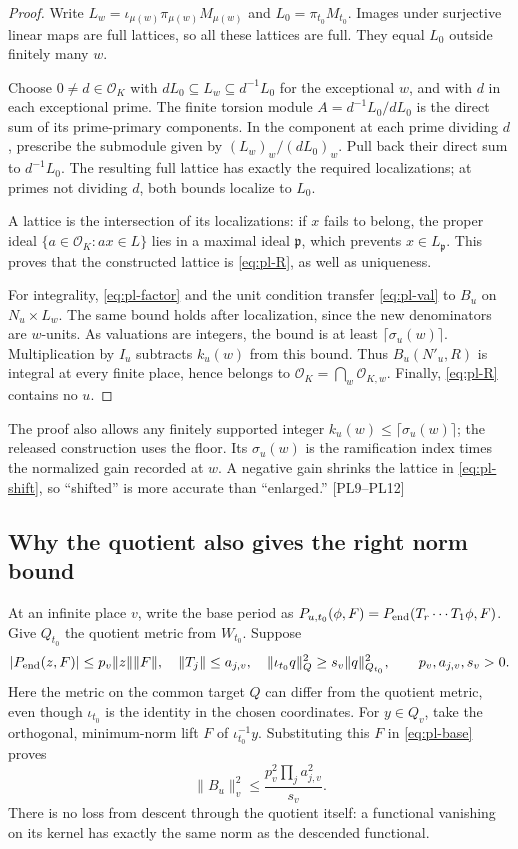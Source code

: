 \documentclass[11pt,a4paper]{article}
\numberwithin{equation}{section}
\theoremstyle{remark}\newtheorem{remark}[theorem]{Remark}
\newcommand{\OK}{\mathcal O_K}
\begin{document}
\begin{proof}
Write $L_w=\iota_{\mu(w)}\pi_{\mu(w)}M_{\mu(w)}$ and $L_0=\pi_{t_0}M_{t_0}$. Images under surjective linear maps are full lattices, so all these lattices are full. They equal $L_0$ outside finitely many $w$.

Choose $0\ne d\in\OK$ with $dL_0\subseteq L_w\subseteq d^{-1}L_0$ for the exceptional $w$, and with $d$ in each exceptional prime. The finite torsion module $A=d^{-1}L_0/dL_0$ is the direct sum of its prime-primary components. In the component at each prime dividing $d$, prescribe the submodule given by $(L_w)_w/(dL_0)_w$. Pull back their direct sum to $d^{-1}L_0$. The resulting full lattice has exactly the required localizations; at primes not dividing $d$, both bounds localize to $L_0$.

A lattice is the intersection of its localizations: if $x$ fails to belong, the proper ideal $\{a\in\OK:ax\in L\}$ lies in a maximal ideal $\mathfrak p$, which prevents $x\in L_{\mathfrak p}$. This proves that the constructed lattice is \eqref{eq:pl-R}, as well as uniqueness.

For integrality, \eqref{eq:pl-factor} and the unit condition transfer \eqref{eq:pl-val} to $B_u$ on $N_u\times L_w$. The same bound holds after localization, since the new denominators are $w$-units. As valuations are integers, the bound is at least $\lceil\sigma_u(w)\rceil$. Multiplication by $I_u$ subtracts $k_u(w)$ from this bound. Thus $B_u(N'_u,R)$ is integral at every finite place, hence belongs to $\OK=\bigcap_w\mathcal O_{K,w}$. Finally, \eqref{eq:pl-R} contains no $u$.
\end{proof}

The proof also allows any finitely supported integer $k_u(w)\le\lceil\sigma_u(w)\rceil$; the released construction uses the floor. Its $\sigma_u(w)$ is the ramification index times the normalized gain recorded at $w$. A negative gain shrinks the lattice in \eqref{eq:pl-shift}, so ``shifted'' is more accurate than ``enlarged.'' \textsf{[PL9--PL12]}

\subsection{Why the quotient also gives the right norm bound}

At an infinite place $v$, write the base period as
$P_{u,t_0}(\phi,F)=P_{\rm end}(T_r\cdots T_1\phi,F)$.
Give $Q_{t_0}$ the quotient metric from $W_{t_0}$. Suppose
\[
 |P_{\rm end}(z,F)|\le p_v\|z\|\|F\|,\quad
 \|T_j\|\le a_{j,v},\quad
 \|\iota_{t_0}q\|_Q^2\ge s_v\|q\|_{Q_{t_0}}^2,
 \qquad p_v,a_{j,v},s_v>0.
\]
Here the metric on the common target $Q$ can differ from the quotient metric, even though $\iota_{t_0}$ is the identity in the chosen coordinates. For $y\in Q_v$, take the orthogonal, minimum-norm lift $F$ of $\iota_{t_0}^{-1}y$. Substituting this $F$ in \eqref{eq:pl-base} proves
\begin{equation}\label{eq:pl-norm}
 \|B_u\|_v^2\le\frac{p_v^2\prod_j a_{j,v}^2}{s_v}.
\end{equation}
There is no loss from descent through the quotient itself: a functional vanishing on its kernel has exactly the same norm as the descended functional.
\end{document}
